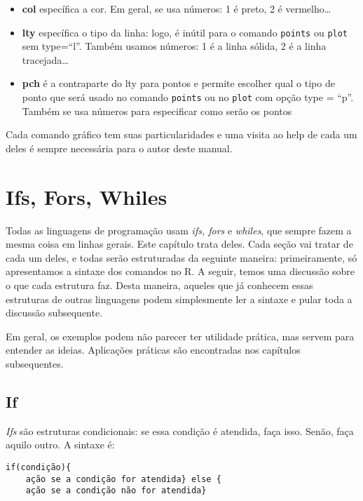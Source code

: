 \documentclass[]{book}
\providecommand{\tightlist}{%
  \setlength{\itemsep}{0pt}\setlength{\parskip}{0pt}}
\begin{document}
\begin{itemize}
\tightlist
\item
  \textbf{col} específica a cor. Em geral, se usa números: 1 é preto, 2
  é vermelho\ldots{}
\item
  \textbf{lty} específica o tipo da linha: logo, é inútil para o comando
  \texttt{points} ou \texttt{plot} sem type=``l''. Também usamos
  números: 1 é a linha sólida, 2 é a linha tracejada\ldots{}
\item
  \textbf{pch} é a contraparte do lty para pontos e permite escolher
  qual o tipo de ponto que será usado no comando \texttt{points} ou no
  \texttt{plot} com opção type = ``p''. Também se usa números para
  especificar como serão os pontos
\end{itemize}

Cada comando gráfico tem suas particularidades e uma visita ao help de
cada um deles é sempre necessária para o autor deste manual.

\chapter{Ifs, Fors, Whiles}\label{ifs-fors-whiles}

Todas as linguagens de programação usam \emph{ifs, fors} e
\emph{whiles}, que sempre fazem a mesma coisa em linhas gerais. Este
capítulo trata deles. Cada seção vai tratar de cada um deles, e todas
serão estruturadas da seguinte maneira: primeiramente, só apresentamos a
sintaxe dos comandos no R. A seguir, temos uma discussão sobre o que
cada estrutura faz. Desta maneira, aqueles que já conhecem essas
estruturas de outras linguagens podem simplesmente ler a sintaxe e pular
toda a discussão subsequente.

Em geral, os exemplos podem não parecer ter utilidade prática, mas
servem para entender as ideias. Aplicações práticas são encontradas nos
capítulos subsequentes.

\section{If}\label{if}

\emph{Ifs} são estruturas condicionais: se essa condição é atendida,
faça isso. Senão, faça aquilo outro. A sintaxe é:

\begin{verbatim}
if(condição){
    ação se a condição for atendida} else {
    ação se a condição não for atendida}
\end{verbatim}
\end{document}

